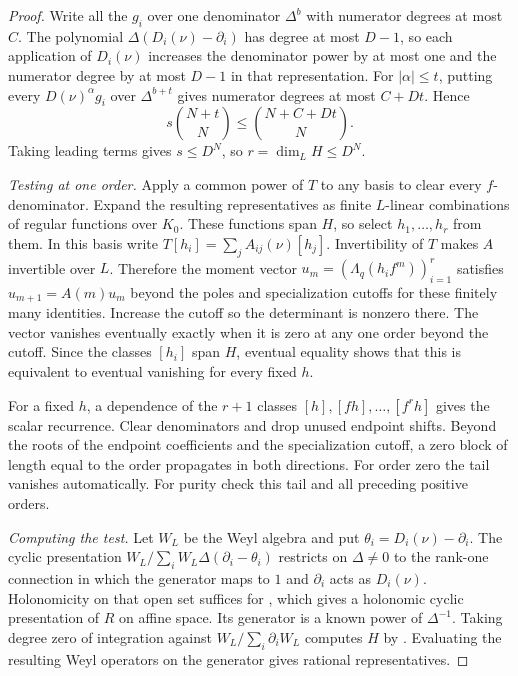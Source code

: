 \documentclass[11pt]{article}
\newcommand{\Lq}{\Lambda_q}
\begin{document}
\begin{proof}
Write all the \(g_i\) over one denominator \(\Delta^b\) with numerator
degrees at most \(C\). The polynomial
\(\Delta(D_i(\nu)-\partial_i)\) has degree at most \(D-1\), so each
application of \(D_i(\nu)\) increases the denominator power by at most
one and the numerator degree by at most \(D-1\) in that representation.
For \(|\alpha|\le t\), putting every \(D(\nu)^\alpha g_i\) over
\(\Delta^{b+t}\) gives numerator degrees at most \(C+Dt\). Hence
\[
 s\binom{N+t}{N}\le \binom{N+C+Dt}{N}.
\]
Taking leading terms gives \(s\le D^N\), so \(r=\dim_L H\le D^N\).

\emph{Testing at one order.}
Apply a common power of \(T\) to any basis to clear every
\(f\)-denominator. Expand the resulting representatives as finite
\(L\)-linear combinations of regular functions over \(K_0\).
These functions span \(H\), so select \(h_1,\ldots,h_r\) from them.
In this basis write \(T[h_i]=\sum_j A_{ij}(\nu)[h_j]\).
Invertibility of \(T\) makes \(A\) invertible over \(L\). Therefore the
moment vector \(u_m=(\Lq(h_i f^m))_{i=1}^r\) satisfies
\(u_{m+1}=A(m)u_m\) beyond the poles and specialization cutoffs
for these finitely many identities. Increase
the cutoff so the determinant is nonzero there. The vector vanishes
eventually exactly when it is zero at any one order beyond the
cutoff. Since the classes \([h_i]\) span \(H\), eventual equality shows
that this is equivalent to eventual vanishing for every fixed \(h\).

For a fixed \(h\), a dependence of the \(r+1\) classes
\([h],[fh],\ldots,[f^r h]\) gives the scalar recurrence. Clear
denominators and drop unused endpoint shifts. Beyond the roots of
the endpoint coefficients and the specialization cutoff, a zero
block of length equal to the order propagates in both directions.
For order zero the tail vanishes automatically. For purity check
this tail and all preceding positive orders.

\emph{Computing the test.}
Let \(W_L\) be the Weyl algebra and put
\(\theta_i=D_i(\nu)-\partial_i\). The cyclic presentation
\(W_L/\sum_i W_L\Delta(\partial_i-\theta_i)\) restricts on
\(\Delta\ne0\) to the rank-one connection in which the generator
maps to \(1\) and \(\partial_i\) acts as \(D_i(\nu)\).
Holonomicity on that open set suffices for
\cite[Algorithm~3]{OTW}, which gives a holonomic cyclic presentation
of \(R\) on affine space. Its generator is a known power of
\(\Delta^{-1}\). Taking degree zero of integration against
\(W_L/\sum_i\partial_i W_L\) computes \(H\) by
\cite[Procedure~1.4]{OT}. Evaluating the resulting Weyl operators
on the generator gives rational representatives.


\end{proof}
\end{document}
